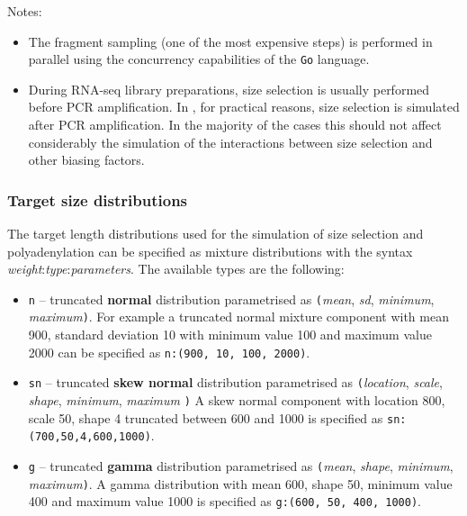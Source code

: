 \begin{enumerate}
Notes:

\begin{itemize}
\item The fragment sampling (one of the most expensive steps) is performed in parallel using the concurrency capabilities of the {\tt Go} language. 
\item During RNA-seq library preparations, size selection is usually performed before PCR amplification. In \rlsim, for practical reasons, size selection is simulated after PCR amplification. In the majority of the cases this should not affect considerably the simulation of the interactions between size selection and other biasing factors.
\end{itemize}

\end{enumerate}

\subsubsection{Target size distributions}
\label{sss:target_mix}

The target length distributions used for the simulation of size selection and polyadenylation can be specified as mixture distributions with the syntax \emph{weight}:\emph{type}:\emph{parameters}. The available types are the following:

\begin{itemize}
\item{{\tt n} -- truncated {\bf normal} distribution \cite{dist_normal} parametrised as {\tt(}\emph{mean}, \emph{sd}, \emph{minimum}, \emph{maximum}{\tt )}. 
For example a truncated normal mixture component with mean 900, standard deviation 10 with minimum value 100 and maximum value 2000 can be specified as \texttt{n:(900, 10, 100, 2000)}}.
\item{{\tt sn} -- truncated {\bf skew normal} distribution \cite{dist_skew_normal} parametrised as \texttt{(}{\it location}, {\it scale}, {\it shape}, {\it minimum}, {\it maximum} \texttt{)}
A skew normal component with location 800, scale 50, shape 4 truncated between 600 and 1000 is specified as {\tt sn:(700,50,4,600,1000)}.}
\item{{\tt g} -- truncated {\bf gamma} distribution \cite{dist_gamma} parametrised as \texttt{(}\emph{mean}, \emph{shape}, \emph{minimum}, \emph{maximum}\texttt{)}. A gamma distribution with mean 600, shape 50, minimum value 400 and maximum value 1000 is specified as {\tt g:(600, 50, 400, 1000)}.
}
\end{itemize}

